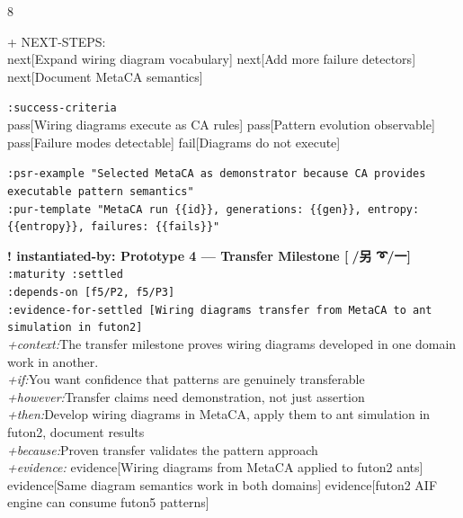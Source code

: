 \documentclass[landscape]{article}
\newcommand{\flexitag}[1]{\textcolor[gray]{0.35}{\textit{#1}}}
\newenvironment{devmapactive}{%
  \def\FrameCommand{\colorbox{devmapactivebg}}%
  \setlength{\fboxsep}{2pt}%
  \MakeFramed{\advance\hsize-\width \FrameRestore}%
}{\endMakeFramed}
\newenvironment{devmapsettled}{%
  \def\FrameCommand{\colorbox{devmapsettledbg}}%
  \setlength{\fboxsep}{2pt}%
  \MakeFramed{\advance\hsize-\width \FrameRestore}%
}{\endMakeFramed}
\begin{document}
\begin{paracol}{8}
\begin{devmapactive}
\par
  + NEXT-STEPS:\\
    next[Expand wiring diagram vocabulary] next[Add more failure detectors] next[Document MetaCA semantics]\\
\par
  \texttt{:\allowbreak{}success-\allowbreak{}criteria}\\
    pass[Wiring diagrams execute as CA rules] pass[Pattern evolution observable] pass[Failure modes detectable] fail[Diagrams do not execute]\\
\par
  \texttt{:\allowbreak{}psr-\allowbreak{}example "Selected MetaCA as demonstrator because CA provides executable pattern semantics"}\\
  \texttt{:\allowbreak{}pur-\allowbreak{}template "MetaCA run \{\{id\}\},\allowbreak{} generations:\allowbreak{} \{\{gen\}\},\allowbreak{} entropy:\allowbreak{} \{\{entropy\}\},\allowbreak{} failures:\allowbreak{} \{\{fails\}\}"}\\
\par
\par
\end{devmapactive}
\begin{devmapsettled}
\textbf{! instantiated-by: Prototype 4 — Transfer Milestone [🔺/另 ➰/一]}\\
  \texttt{:\allowbreak{}maturity :\allowbreak{}settled}\\
  \texttt{:\allowbreak{}depends-\allowbreak{}on [f5/\allowbreak{}P2,\allowbreak{} f5/\allowbreak{}P3]}\\
  \texttt{:\allowbreak{}evidence-\allowbreak{}for-\allowbreak{}settled [Wiring diagrams transfer from MetaCA to ant simulation in futon2]}\\
  \flexitag{+context:}The transfer milestone proves wiring diagrams developed in one domain work in another.\\
  \flexitag{+if:}You want confidence that patterns are genuinely transferable\\
  \flexitag{+however:}Transfer claims need demonstration, not just assertion\\
  \flexitag{+then:}Develop wiring diagrams in MetaCA, apply them to ant simulation in futon2, document results\\
  \flexitag{+because:}Proven transfer validates the pattern approach\\
  \flexitag{+evidence:} evidence[Wiring diagrams from MetaCA applied to futon2 ants] evidence[Same diagram semantics work in both domains] evidence[futon2 AIF engine can consume futon5 patterns]\\

\end{devmapsettled}
\end{paracol}
\end{document}
